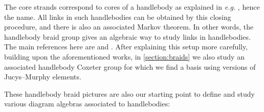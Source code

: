 \documentclass[a4paper,11pt]{amsart}
\newcommand{\eg}{\textsl{e.g.}}
\numberwithin{equation}{section}
\let\fullref\autoref
\begin{document}
The core strands correspond to cores of a 
handlebody as explained in {\eg} 
\cite[Section 2]{RoTu-homflypt-typea}, hence the name. All links in such handlebodies can 
be obtained by this closing procedure, and there is also an associated 
Markov theorem. In other words, the handlebody braid group gives an 
algebraic way to study links in handlebodies. The main references 
here are \cite{Ve-handlebodies} and \cite{HaOlLa-handlebodies}.
After explaining this setup more carefully, building upon the aforementioned 
works, in \fullref{section:braids} 
we also study an associated handlebody Coxeter group for which we find a basis 
using versions of Jucys--Murphy elements.

These handlebody braid pictures are also our starting point to define and study 
various diagram algebras associated to handlebodies:
\end{document}
